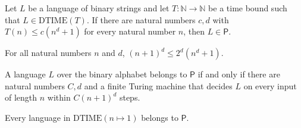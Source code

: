 \begin{theorem}
\label{Complexity.mem_P_of_dtime_le}
\leanok
{}
Let $L$ be a language of binary strings and let $T:\mathbb{N}\to\mathbb{N}$ be a time
bound such that $L\in\mathrm{DTIME}(T)$. If there are natural numbers $c,d$ with
$T(n)\le c(n^d+1)$ for every natural number $n$, then $L\in\mathsf{P}$.
\end{theorem}

\begin{lemma}
\label{Complexity.succ_pow_le}
\leanok
{}
For all natural numbers $n$ and $d$, $(n+1)^d\le 2^d(n^d+1)$.
\end{lemma}

\begin{theorem}
\label{Complexity.mem_P_iff}
\leanok
{}
A language $L$ over the binary alphabet belongs to $\mathsf{P}$ if and only if there are
natural numbers $C,d$ and a finite Turing machine that decides $L$ on every input of
length $n$ within $C(n+1)^d$ steps.
\end{theorem}

\begin{theorem}
\label{Complexity.dtime_one_subset_P}
\leanok
{}
Every language in $\mathrm{DTIME}(n\mapsto 1)$ belongs to $\mathsf{P}$.
\end{theorem}
